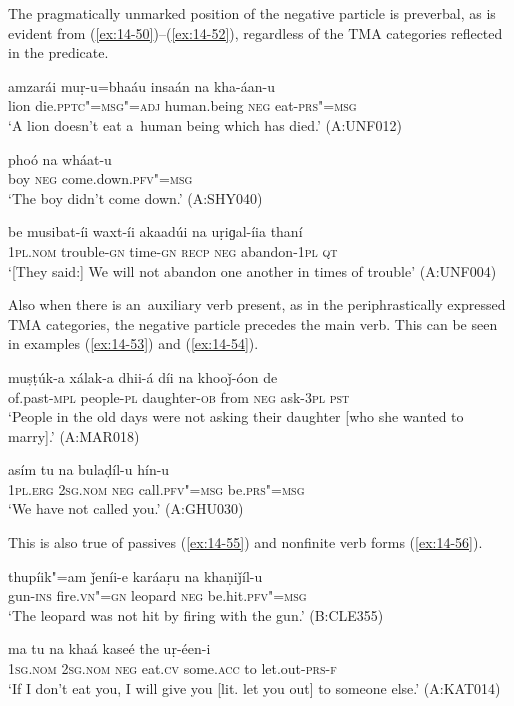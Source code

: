 The pragmatically unmarked position of the negative particle is preverbal, as is evident from (\ref{ex:14-50})--(\ref{ex:14-52}), regardless of the TMA categories reflected in the predicate.

\begin{exe}
\ex
\label{ex:14-50}
\gll amzarái muṛ-u=bhaáu insaán na kha-áan-u \\
lion die.\textsc{pptc"=msg"=adj} human.being \textsc{neg} eat-\textsc{prs"=msg} \\
\glt `A lion doesn't eat a~human being which has died.' (A:UNF012)

\ex
\label{ex:14-51}
\gll phoó na wháat-u \\
boy \textsc{neg} come.down.\textsc{pfv"=msg } \\
\glt `The boy didn't come down.' (A:SHY040)

\ex
\label{ex:14-52}
\gll be musibat-íi waxt-íi akaadúi na uṛiɡal-íia  thaní \\
\textsc{1pl.nom} trouble-\textsc{gn} time-\textsc{gn} \textsc{recp} \textsc{neg} abandon-\textsc{1pl} \textsc{qt} \\
\glt `[They said:] We will not abandon one another in times of trouble' (A:UNF004)
\end{exe}

Also when there is an~auxiliary verb present, as in the periphrastically expressed TMA categories, the negative particle precedes the main verb. This can be seen in examples (\ref{ex:14-53}) and (\ref{ex:14-54}).

\begin{exe}
\ex
\label{ex:14-53}
\gll muṣṭúk-a xálak-a dhii-á díi na  khooǰ-óon de \\
of.past-\textsc{mpl} people-\textsc{pl} daughter-\textsc{ob} from \textsc{neg} ask-\textsc{3pl} \textsc{pst}  \\
\glt `People in the old days were not asking their daughter [who she wanted to marry].' (A:MAR018)

\ex
\label{ex:14-54}
\gll asím tu na bulaḍíl-u hín-u \\
\textsc{1pl.erg} \textsc{2sg.nom} \textsc{neg} call.\textsc{pfv"=msg} be.\textsc{prs"=msg} \\
\glt `We have not called you.' (A:GHU030)
\end{exe}

This is also true of passives (\ref{ex:14-55}) and nonfinite verb forms (\ref{ex:14-56}).

\begin{exe}
\ex
\label{ex:14-55}
\gll thupíik"=am ǰeníi-e karáaṛu na khaṇiǰíl-u \\
gun-\textsc{ins} fire.\textsc{vn"=gn} leopard \textsc{neg} be.hit.\textsc{pfv"=msg}  \\
\glt `The leopard was not hit by firing with the gun.' (B:CLE355)

\ex
\label{ex:14-56}
\gll ma tu na khaá kaseé  the uṛ-éen-i \\
\textsc{1sg.nom} \textsc{2sg.nom} \textsc{neg} eat.\textsc{cv} some.\textsc{acc} to let.out-\textsc{prs-f} \\
\glt `If I don't eat you, I will give you [lit. let you out] to someone else.' (A:KAT014)
\end{exe}

